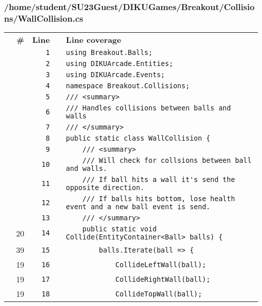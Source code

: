 \documentclass[a4paper,landscape,10pt]{article}
\begin{document}
\subsubsection{/home/student/SU23Guest/DIKUGames/Breakout/Collisions/WallCollision.cs}
\begin{longtable}[l]{lrrll}
\textbf{} & \textbf{\#} & \textbf{Line} & \textbf{} & \textbf{Line coverage}\\
\cellcolor{gray} &  & \verb~1~ & & \verb~using Breakout.Balls;~\\
\cellcolor{gray} &  & \verb~2~ & & \verb~using DIKUArcade.Entities;~\\
\cellcolor{gray} &  & \verb~3~ & & \verb~using DIKUArcade.Events;~\\
\cellcolor{gray} &  & \verb~4~ & & \verb~namespace Breakout.Collisions;~\\
\cellcolor{gray} &  & \verb~5~ & & \verb~/// <summary>~\\
\cellcolor{gray} &  & \verb~6~ & & \verb~/// Handles collisions between balls and walls~\\
\cellcolor{gray} &  & \verb~7~ & & \verb~/// </summary>~\\
\cellcolor{gray} &  & \verb~8~ & & \verb~public static class WallCollision {~\\
\cellcolor{gray} &  & \verb~9~ & & \verb~    /// <summary>~\\
\cellcolor{gray} &  & \verb~10~ & & \verb~    /// Will check for collsions between ball and walls.~\\
\cellcolor{gray} &  & \verb~11~ & & \verb~    /// If ball hits a wall it's send the opposite direction.~\\
\cellcolor{gray} &  & \verb~12~ & & \verb~    /// If balls hits bottom, lose health event and a new ball event is send.~\\
\cellcolor{gray} &  & \verb~13~ & & \verb~    /// </summary>~\\
\cellcolor{green} & 20 & \verb~14~ & & \verb~    public static void Collide(EntityContainer<Ball> balls) {~\\
\cellcolor{green} & 39 & \verb~15~ & & \verb~        balls.Iterate(ball => {~\\
\cellcolor{green} & 19 & \verb~16~ & & \verb~            CollideLeftWall(ball);~\\
\cellcolor{green} & 19 & \verb~17~ & & \verb~            CollideRightWall(ball);~\\
\cellcolor{green} & 19 & \verb~18~ & & \verb~            CollideTopWall(ball);~\\

\end{longtable}
\end{document}
